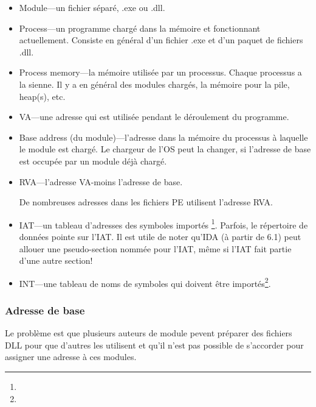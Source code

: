 \begin{itemize}
\item Module---un fichier séparé, .exe ou .dll.

\item Process---un programme chargé dans la mémoire et fonctionnant actuellement.
Consiste en général d'un fichier .exe et d'un paquet de fichiers .dll.

\item Process memory---la mémoire utilisée par un processus. Chaque processus a la
sienne. Il y a en général des modules chargés, la mémoire pour la pile, \gls{heap}(s),
etc.

\item \ac{VA}---une adresse qui est utilisée pendant le déroulement du programme.

\item Base address (du module)---l'adresse dans la mémoire du processus à laquelle
le module est chargé. Le chargeur de l'\ac{OS} peut la changer, si l'adresse de base
est occupée par un module déjà chargé.

\item \ac{RVA}---l'adresse \ac{VA}-moins l'adresse de base.

De nombreuses adresses dans les fichiers PE utilisent l'adresse \ac{RVA}.


\item \ac{IAT}---un tableau d'adresses des symboles importés \footnote{\PietrekPE}. 
Parfois, le répertoire de données  pointe sur l'\ac{IAT}.
\label{IDA_idata}
Il est utile de noter qu'\ac{IDA} (à partir de 6.1) peut allouer une pseudo-section
nommée  pour l'\ac{IAT}, même si l'\ac{IAT} fait partie d'une autre section!

\item \ac{INT}---une tableau de noms de symboles qui doivent être importés\footnote{\PietrekPE}.
\end{itemize}

\subsubsection{Adresse de base}

Le problème est que plusieurs auteurs de module pevent préparer des fichiers DLL
pour que d'autres les utilisent et qu'il n'est pas possible de s'accorder pour assigner
une adresse à ces modules.

